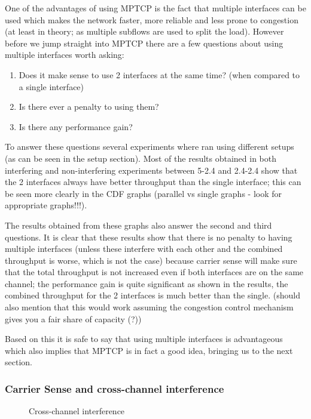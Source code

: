 One of the advantages of using MPTCP is the fact that multiple interfaces can be
used which makes the network faster, more reliable and less prone to congestion
(at least in theory; as multiple subflows are used to split the load). However
before we jump straight into MPTCP there are a few questions about using
multiple interfaces worth asking:

\begin{enumerate}
  \item Does it make sense to use 2 interfaces at the same time? (when compared
    to a single interface)
  \item Is there ever a penalty to using them?
  \item Is there any performance gain?
\end{enumerate}

To answer these questions several experiments where ran using different setups
(as can be seen in the setup section). Most of the results obtained in both
interfering and non-interfering experiments between 5-2.4 and 2.4-2.4 show that
the 2 interfaces always have better throughput than the single interface; this
can be seen more clearly in the CDF graphs (parallel vs single graphs - look for
appropriate graphs!!!).


The results obtained from these graphs also answer the second and third
questions. It is clear that these results show that there is no penalty to
having multiple interfaces (unless these interfere with each other and the
combined throughput is worse, which is not the case) because carrier sense will
make sure that the total throughput is not increased even if both interfaces are
on the same channel; the performance gain is quite significant as shown in the
results, the combined throughput for the 2 interfaces is much better than the
single. (should also mention that this would work assuming the congestion
control mechanism gives you a fair share of capacity (?))

Based on this it is safe to say that using multiple interfaces is advantageous
which also implies that MPTCP is in fact a good idea, bringing us to the next
section.

\subsubsection{Carrier Sense and cross-channel interference}
\begin{figure}[h]
 \centering
 
 \caption{Cross-channel interference}\label{graph:cc-interference}
\end{figure}

